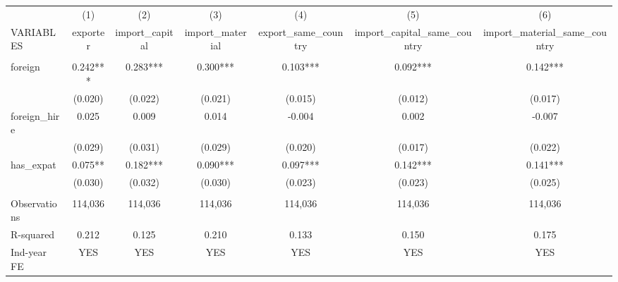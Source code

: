 \begin{tabular}{lcccccc} \hline
 & (1) & (2) & (3) & (4) & (5) & (6) \\
VARIABLES & exporter & import\_capital & import\_material & export\_same\_country & import\_capital\_same\_country & import\_material\_same\_country \\ \hline
 &  &  &  &  &  &  \\
foreign & 0.242*** & 0.283*** & 0.300*** & 0.103*** & 0.092*** & 0.142*** \\
 & (0.020) & (0.022) & (0.021) & (0.015) & (0.012) & (0.017) \\
foreign\_hire & 0.025 & 0.009 & 0.014 & -0.004 & 0.002 & -0.007 \\
 & (0.029) & (0.031) & (0.029) & (0.020) & (0.017) & (0.022) \\
has\_expat & 0.075** & 0.182*** & 0.090*** & 0.097*** & 0.142*** & 0.141*** \\
 & (0.030) & (0.032) & (0.030) & (0.023) & (0.023) & (0.025) \\
 &  &  &  &  &  &  \\
Observations & 114,036 & 114,036 & 114,036 & 114,036 & 114,036 & 114,036 \\
R-squared & 0.212 & 0.125 & 0.210 & 0.133 & 0.150 & 0.175 \\
 Ind-year FE & YES & YES & YES & YES & YES & YES \\ \hline
\end{tabular}
